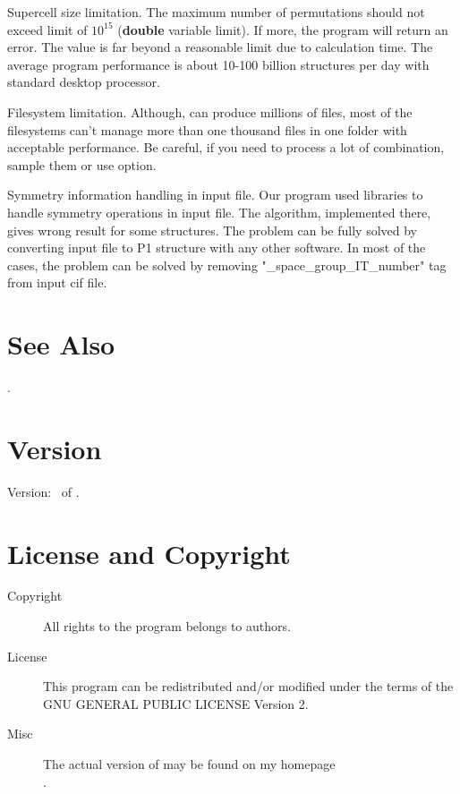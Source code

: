 \documentclass[a4paper,english]{article}
\begin{document}
\begin{Description}\setlength{\itemsep}{0cm}
\item[Supercell size limitation.]
The maximum number of permutations should not exceed limit of $10^{15}$ (\textbf{double} variable limit). If more, the program will return an error. The value is far beyond a reasonable limit due to calculation time. The average program performance is about 10-100 billion structures per day with standard desktop processor.
\item[Filesystem limitation.]
Although,  can produce millions of files, most of the filesystems can't manage more than one thousand files in one folder with acceptable performance. Be careful, if you need to process a lot of combination, sample them or use  option.
\item[Symmetry information handling in input file.]
Our program used  libraries to handle symmetry operations in input file. The algorithm, implemented there, gives wrong result for some structures. The problem can be fully solved by converting input file to P1 structure with any other software. In most of the cases, the problem can be solved by removing "\_space\_group\_IT\_number" tag from input cif file.

\end{Description}

\section{See Also}

.


\section{Version}

Version: \Version\ of \Date.

\section{License and Copyright}

\begin{description}
\item[Copyright] 
     All rights to the program belongs to authors.

\item[License] This program can be redistributed and/or modified under the
     terms of the GNU GENERAL PUBLIC LICENSE Version 2.

\item[Misc]
     The actual version of   may be found on my homepage\\
     .

\end{description}
\end{document}
